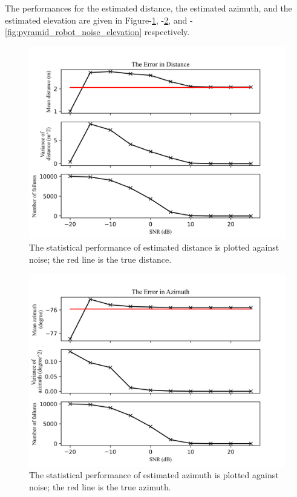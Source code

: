 \documentclass[notitlepage]{report}
\begin{document}
The performances for the estimated distance, the estimated azimuth, and the estimated elevation are given in Figure-\ref{fig:pyramid_robot_noise_distance}, -\ref{fig:pyramid_robot_noise_azimuth}, and -\ref{fig:pyramid_robot_noise_elevation} respectively.


\begin{figure}[H]
\includegraphics[width=1\textwidth]{../Python/pyramid_robot/noise_distance.png}
\centering
\caption{The statistical performance of estimated distance is plotted against noise; the red line is the true distance.}
\label{fig:pyramid_robot_noise_distance}
\centering
\end{figure}

\begin{figure}[H]
\includegraphics[width=1\textwidth]{../Python/pyramid_robot/noise_azimuth.png}
\centering
\caption{The statistical performance of estimated azimuth is plotted against noise; the red line is the true azimuth.}
\label{fig:pyramid_robot_noise_azimuth}
\centering
\end{figure}
\end{document}
